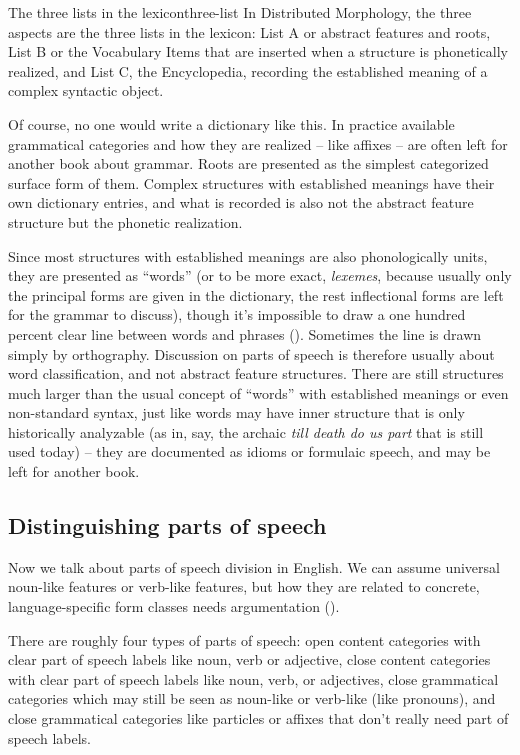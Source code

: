 \documentclass[UTF8, a4paper, oneside, scheme=plain]{ctexrep}
\newcommand*{\term}[1]{\emph{#1}}
\newcommand{\corpus}[1]{\emph{#1}}
\begin{document}
\begin{theorybox}{The three lists in the lexicon}{three-list}
    In Distributed Morphology,
    the three aspects are the three lists in the lexicon:
    List A or abstract features and roots,
    List B or the Vocabulary Items that are inserted when a structure is phonetically realized,
    and List C, the Encyclopedia, recording the established meaning of a complex syntactic object.
\end{theorybox}

Of course, no one would write a dictionary like this.
In practice available grammatical categories and how they are realized -- like affixes -- 
are often left for another book about grammar.
Roots are presented as the simplest categorized surface form of them.
Complex structures with established meanings have their own dictionary entries,
and what is recorded is also not the abstract feature structure but the phonetic realization.

Since most structures with established meanings 
are also phonologically units,
they are presented as ``words''
(or to be more exact, \term{lexemes}, 
because usually only the principal forms are given in the dictionary,
the rest inflectional forms are left for the grammar to discuss),
though it's impossible to draw a one hundred percent clear line 
between words and phrases ().
Sometimes the line is drawn simply by orthography.
Discussion on parts of speech is therefore usually about word classification,
and not abstract feature structures.
There are still structures much larger than the usual concept of ``words'' 
with established meanings or even non-standard syntax,
just like words may have inner structure that is only historically analyzable
(as in, say, the archaic \corpus{till death do us part} that is still used today) -- 
they are documented as idioms or formulaic speech,
and may be left for another book.

\subsection{Distinguishing parts of speech}

Now we talk about parts of speech division in English.
We can assume universal noun-like features or verb-like features,
but how they are related to concrete, language-specific form classes needs argumentation ().

There are roughly four types of parts of speech:
open content categories with clear part of speech labels like noun, verb or adjective,
close content categories with clear part of speech labels like noun, verb, or adjectives,
close grammatical categories which may still be seen as noun-like or verb-like (like pronouns),
and close grammatical categories like particles or affixes that don't really need part of speech labels.
\end{document}
